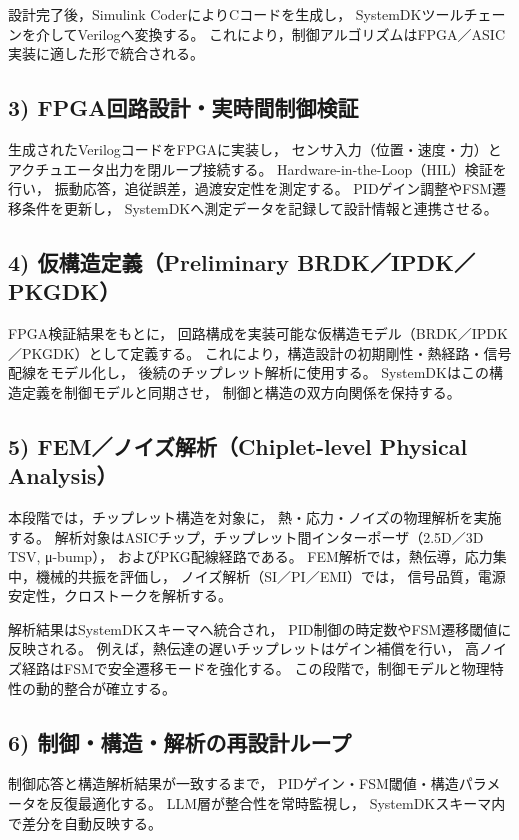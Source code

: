 設計完了後，Simulink CoderによりCコードを生成し，
SystemDKツールチェーンを介してVerilogへ変換する。
これにより，制御アルゴリズムはFPGA／ASIC実装に適した形で統合される。

\subsection{3) FPGA回路設計・実時間制御検証}
生成されたVerilogコードをFPGAに実装し，
センサ入力（位置・速度・力）とアクチュエータ出力を閉ループ接続する。
Hardware-in-the-Loop（HIL）検証を行い，
振動応答，追従誤差，過渡安定性を測定する。
PIDゲイン調整やFSM遷移条件を更新し，
SystemDKへ測定データを記録して設計情報と連携させる。

\subsection{4) 仮構造定義（Preliminary BRDK／IPDK／PKGDK）}
FPGA検証結果をもとに，
回路構成を実装可能な仮構造モデル（BRDK／IPDK／PKGDK）として定義する。
これにより，構造設計の初期剛性・熱経路・信号配線をモデル化し，
後続のチップレット解析に使用する。
SystemDKはこの構造定義を制御モデルと同期させ，
制御と構造の双方向関係を保持する。

\subsection{5) FEM／ノイズ解析（Chiplet-level Physical Analysis）}
本段階では，チップレット構造を対象に，
熱・応力・ノイズの物理解析を実施する。
解析対象はASICチップ，チップレット間インターポーザ（2.5D／3D TSV, μ-bump），
およびPKG配線経路である。
FEM解析では，熱伝導，応力集中，機械的共振を評価し，
ノイズ解析（SI／PI／EMI）では，
信号品質，電源安定性，クロストークを解析する。

解析結果はSystemDKスキーマへ統合され，
PID制御の時定数やFSM遷移閾値に反映される。
例えば，熱伝達の遅いチップレットはゲイン補償を行い，
高ノイズ経路はFSMで安全遷移モードを強化する。
この段階で，制御モデルと物理特性の動的整合が確立する。

\subsection{6) 制御・構造・解析の再設計ループ}
制御応答と構造解析結果が一致するまで，
PIDゲイン・FSM閾値・構造パラメータを反復最適化する。
LLM層が整合性を常時監視し，
SystemDKスキーマ内で差分を自動反映する。

